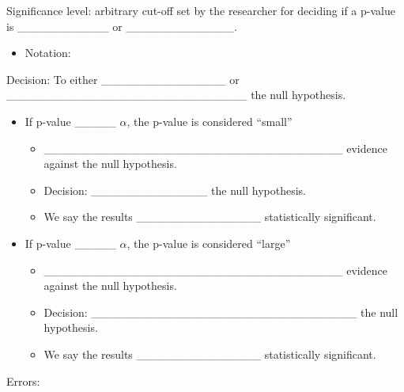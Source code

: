 \documentclass[
]{report}
\providecommand{\tightlist}{%
  \setlength{\itemsep}{0pt}\setlength{\parskip}{0pt}}
\begin{document}

Significance level: arbitrary cut-off set by the researcher for deciding if a p-value is \_\_\_\_\_\_\_\_\_\_\_ or \_\_\_\_\_\_\_\_\_\_\_\_\_.

\begin{itemize}
\tightlist
\item
  Notation:
\end{itemize}

\vspace{0.2in}

Decision: To either \_\_\_\_\_\_\_\_\_\_\_\_\_\_\_ or \_\_\_\_\_\_\_\_\_\_\_\_\_\_\_\_\_\_\_\_\_\_\_\_\_\_\_\_\_ the null hypothesis.

\begin{itemize}
\item
  If p-value \_\_\_\_\_ \(\alpha\), the p-value is considered ``small''

  \begin{itemize}
  \item
    \_\_\_\_\_\_\_\_\_\_\_\_\_\_\_\_\_\_\_\_\_\_\_\_\_\_\_\_\_\_\_\_\_\_\_\_ evidence against the null hypothesis.
  \item
    Decision: \_\_\_\_\_\_\_\_\_\_\_\_\_\_ the null hypothesis.
  \item
    We say the results \_\_\_\_\_\_\_\_\_\_\_\_\_\_\_ statistically significant.
  \end{itemize}
\item
  If p-value \_\_\_\_\_ \(\alpha\), the p-value is considered ``large''

  \begin{itemize}
  \item
    \_\_\_\_\_\_\_\_\_\_\_\_\_\_\_\_\_\_\_\_\_\_\_\_\_\_\_\_\_\_\_\_\_\_\_\_ evidence against the null hypothesis.
  \item
    Decision: \_\_\_\_\_\_\_\_\_\_\_\_\_\_\_\_\_\_\_\_\_\_\_\_\_\_\_\_\_\_\_\_ the null hypothesis.
  \item
    We say the results \_\_\_\_\_\_\_\_\_\_\_\_\_\_\_ statistically significant.
  \end{itemize}
\end{itemize}

Errors:
\end{document}
